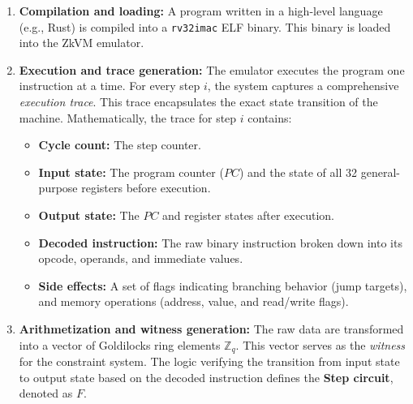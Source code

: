 \begin{enumerate}
	\item \textbf{Compilation and loading:} A program written in a high-level
	      language (e.g., Rust) is compiled into a \texttt{rv32imac} ELF binary.
	      This binary is loaded into the ZkVM emulator.

	\item \textbf{Execution and trace generation:} The emulator executes the
	      program one instruction at a time. For every step $i$, the system
	      captures a comprehensive \textit{execution trace}. This trace
	      encapsulates the exact state transition of the machine.
	      Mathematically, the trace for step $i$ contains:
	      \begin{itemize}
		      \item \textbf{Cycle count:} The step counter.
		      \item \textbf{Input state:} The program counter ($PC$) and the state
		            of all 32 general-purpose registers before execution.
		      \item \textbf{Output state:} The $PC$ and register states after execution.
		      \item \textbf{Decoded instruction:} The raw binary instruction broken
		            down into its opcode, operands, and immediate values.
		      \item \textbf{Side effects:} A set of flags indicating branching
		            behavior (jump targets), and memory operations (address,
		            value, and read/write flags).
	      \end{itemize}

	\item \textbf{Arithmetization and witness generation:} The raw data are
	      transformed into a vector of Goldilocks ring elements $\mathbb{Z}_q$.
	      This vector serves as the \textit{witness} for the constraint system.
	      The logic verifying the transition from input state to output state
	      based on the decoded instruction defines the \textbf{Step circuit},
	      denoted as $F$.


\end{enumerate}

